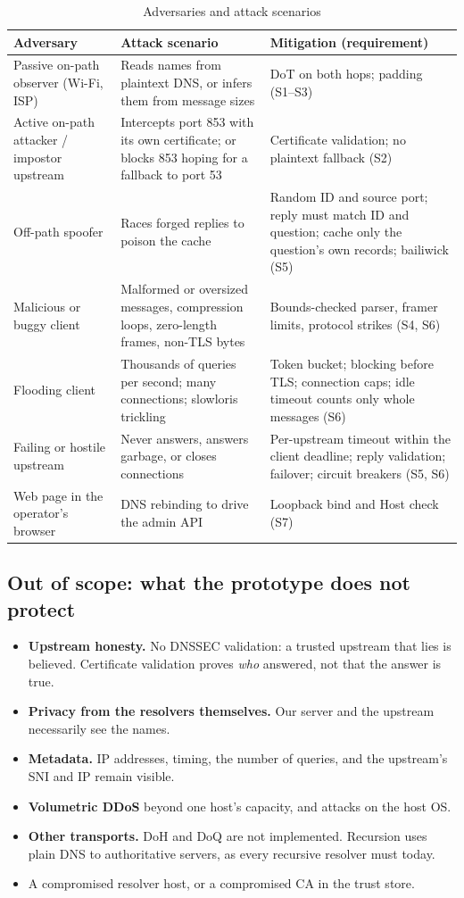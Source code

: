 \documentclass[11pt,a4paper]{article}
\begin{document}
\begin{table}[H]
\centering\small
\caption{Adversaries and attack scenarios}\label{tab:threats}
\begin{tabularx}{\textwidth}{@{}P{3.3cm}LP{4.2cm}@{}}
\toprule
Adversary & Attack scenario & Mitigation (requirement) \\
\midrule
Passive on-path observer (Wi-Fi, ISP) & Reads names from plaintext DNS, or infers them from message sizes & DoT on both hops; padding (S1--S3) \\
Active on-path attacker / impostor upstream & Intercepts port 853 with its own certificate; or blocks 853 hoping for a fallback to port 53 & Certificate validation; no plaintext fallback (S2) \\
Off-path spoofer & Races forged replies to poison the cache & Random ID and source port; reply must match ID and question; cache only the question's own records; bailiwick (S5) \\
Malicious or buggy client & Malformed or oversized messages, compression loops, zero-length frames, non-TLS bytes & Bounds-checked parser, framer limits, protocol strikes (S4, S6) \\
Flooding client & Thousands of queries per second; many connections; slowloris trickling & Token bucket; blocking before TLS; connection caps; idle timeout counts only whole messages (S6) \\
Failing or hostile upstream & Never answers, answers garbage, or closes connections & Per-upstream timeout within the client deadline; reply validation; failover; circuit breakers (S5, S6) \\
Web page in the operator's browser & DNS rebinding to drive the admin API & Loopback bind and Host check (S7) \\
\bottomrule
\end{tabularx}
\end{table}

\subsection{Out of scope: what the prototype does not protect}
\begin{itemize}
  \item \textbf{Upstream honesty.} No DNSSEC validation: a trusted upstream that lies is believed. Certificate
  validation proves \emph{who} answered, not that the answer is true.
  \item \textbf{Privacy from the resolvers themselves.} Our server and the upstream necessarily see the names.
  \item \textbf{Metadata.} IP addresses, timing, the number of queries, and the upstream's SNI and IP remain visible.
  \item \textbf{Volumetric DDoS} beyond one host's capacity, and attacks on the host OS.
  \item \textbf{Other transports.} DoH and DoQ are not implemented. Recursion uses plain DNS to authoritative
  servers, as every recursive resolver must today.
  \item A compromised resolver host, or a compromised CA in the trust store.
\end{itemize}
\end{document}

